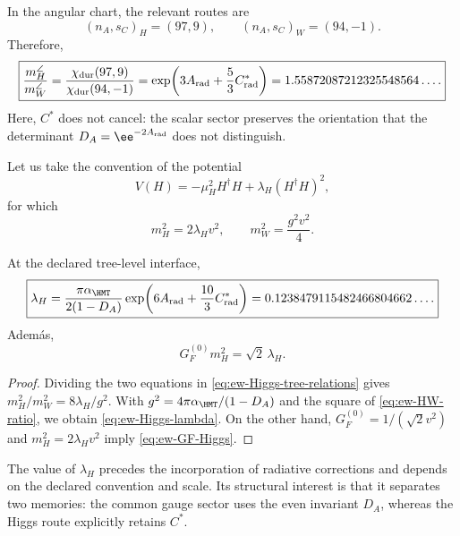 In the angular chart, the relevant routes are
\begin{equation}
\label{eq:ew-HW-signatures}
(n_A,s_C)_H=(97,9),
\qquad
(n_A,s_C)_W=(94,-1).
\end{equation}
Therefore,
\begin{equation}
\label{eq:ew-HW-ratio}
\boxed{
\frac{m_H^{\angle}}{m_W^{\angle}}
=\frac{\chi_{\rm dur}(97,9)}{\chi_{\rm dur}(94,-1)}
=\exp\!\left(3A_{\rm rad}+\frac53C^*_{\rm rad}\right)
=1.55872087212325548564\ldots .}
\end{equation}
Here, \(C^*\) does not cancel: the scalar sector preserves the orientation
that the determinant \(D_A=\ee^{-2A_{\rm rad}}\) does not distinguish.

Let us take the convention of the potential
\begin{equation}
\label{eq:ew-Higgs-potential}
V(H)=-\mu_H^2H^\dagger H
+\lambda_H(H^\dagger H)^2,
\end{equation}
for which
\begin{equation}
\label{eq:ew-Higgs-tree-relations}
m_H^2=2\lambda_Hv^2,
\qquad
m_W^2=\frac{g^2v^2}{4}.
\end{equation}

\begin{corollary}
\label{cor:ew-Higgs-lambda}
At the declared tree-level interface,
\begin{equation}
\label{eq:ew-Higgs-lambda}
\boxed{
\lambda_H
=\frac{\pi\alpha_{\HMT}}{2(1-D_A)}
\exp\!\left(6A_{\rm rad}+\frac{10}{3}C^*_{\rm rad}\right)
=0.1238479115482466804662\ldots .}
\end{equation}
Adem\'as,
\begin{equation}
\label{eq:ew-GF-Higgs}
G_F^{(0)}m_H^2=\sqrt2\,\lambda_H.
\end{equation}
\end{corollary}

\begin{proof}
Dividing the two equations in
\cref{eq:ew-Higgs-tree-relations} gives
\(m_H^2/m_W^2=8\lambda_H/g^2\). With
\(g^2=4\pi\alpha_{\HMT}/(1-D_A)\) and the square of
\cref{eq:ew-HW-ratio}, we obtain \cref{eq:ew-Higgs-lambda}. On the other hand,
\(G_F^{(0)}=1/(\sqrt2v^2)\) and
\(m_H^2=2\lambda_Hv^2\) imply
\cref{eq:ew-GF-Higgs}.
\end{proof}

The value of \(\lambda_H\) precedes the incorporation of radiative corrections and depends on the declared convention and scale. Its structural interest is that it separates two memories: the common gauge sector uses the even invariant \(D_A\), whereas the Higgs route explicitly retains \(C^*\).

